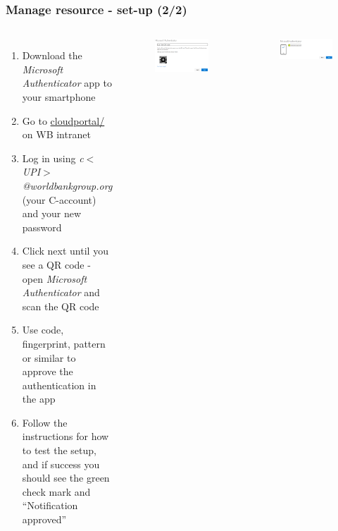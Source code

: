 \documentclass[aspectratio=169]{beamer} %
\begin{document}
\begin{frame}
	\frametitle{Manage resource - set-up (2/2)}
	\begin{columns}[c]


		\begin{enumerate}
			\item Download the \textit{Microsoft Authenticator} app to your smartphone
			\item Go to \url{cloudportal/} on WB intranet
			\item Log in using \textit{c$<$UPI$>$@worldbankgroup.org}
			(your C-account) and your new password
			\item Click next until you see a QR code
			- open \textit{Microsoft Authenticator} and scan the QR code
			\item Use code, fingerprint, pattern or similar to approve the authentication in the app
			\item Follow the instructions for how to test the setup,
			and if success you should see the green check mark and ``Notification approved''

		\end{enumerate}

		\begin{figure}
			\centering
			\includegraphics[width=1\textwidth]{./img/microsoft-auth-1.png}
		\end{figure}
			\begin{figure}
			\centering
			\includegraphics[width=1\textwidth]{./img/microsoft-auth-2.png}
		\end{figure}

	\end{columns}
\end{frame}
\end{document}
